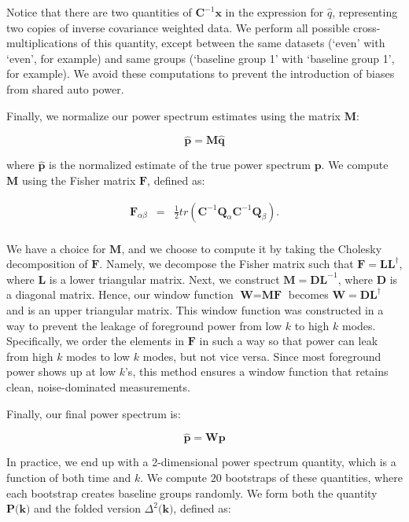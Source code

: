 \documentclass[preprint2,numberedappendix,tighten,twocolappendix]{aastex6}  %
\begin{document}
Notice that there are two quantities of $\textbf{C}^{-1}\textbf{x}$ in the expression for $\hat{q}$, representing two copies of inverse covariance weighted data. We perform all possible cross-multiplications of this quantity, except between the same datasets (`even' with `even', for example) and same groups (`baseline group 1' with `baseline group 1', for example). We avoid these computations to prevent the introduction of biases from shared auto power.

Finally, we normalize our power spectrum estimates using the matrix $\textbf{M}$:

\begin{equation}
\hat{\textbf{p}} = \textbf{M}\hat{\textbf{q}}
\end{equation}

where $\hat{\textbf{p}}$ is the normalized estimate of the true power spectrum $\textbf{p}$. We compute $\textbf{M}$ using the Fisher matrix $\textbf{F}$, defined as:

\begin{eqnarray}
\textbf{F}_{\alpha\beta} &=& \frac{1}{2}tr(\textbf{C}^{-1}\textbf{Q}_{\alpha}\textbf{C}^{-1}\textbf{Q}_{\beta}). \\
\end{eqnarray}

We have a choice for $\textbf{M}$, and we choose to compute it by taking the Cholesky decomposition of $\textbf{F}$. Namely, we decompose the Fisher matrix such that $\textbf{F} = \textbf{L}\textbf{L}^{\dagger}$, where $\textbf{L}$ is a lower triangular matrix. Next, we construct $\textbf{M} = \textbf{D}\textbf{L}^{-1}$, where \textbf{D} is a diagonal matrix. Hence, our window function $\textbf{W} = \textbf{MF}$ becomes $\textbf{W} = \textbf{D}\textbf{L}^{\dagger}$ and is an upper triangular matrix. This window function was constructed in a way to prevent the leakage of foreground power from low $k$ to high $k$ modes. Specifically, we order the elements in $\textbf{F}$ in such a way so that power can leak from high $k$ modes to low $k$ modes, but not vice versa. Since most foreground power shows up at low $k$'s, this method ensures a window function that retains clean, noise-dominated measurements.

Finally, our final power spectrum is:

\begin{equation}
\hat{\textbf{p}} = \textbf{Wp}
\end{equation}

In practice, we end up with a 2-dimensional power spectrum quantity, which is a function of both time and $k$. We compute $20$ bootstraps of these quantities, where each bootstrap creates baseline groups randomly. We form both the quantity $\textbf{P(k)}$ and the folded version $\Delta^{2}\textbf{(k)}$, defined as:
\end{document}
